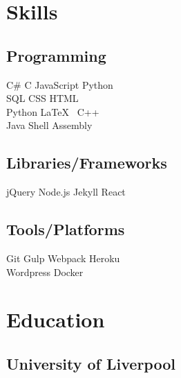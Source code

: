 \documentclass[]{CV}
\begin{document}
\begin{minipage}[t]{0.25\textwidth} 


\section{Skills}
\subsection{Programming}
\sectionsep
{}
C\# \textbullet{} C \textbullet{} JavaScript \textbullet{} Python    \\ SQL \textbullet{} CSS \textbullet{} HTML \textbullet{} \\
\sectionsep
{}
Python \textbullet{} \LaTeX\ \textbullet{}  C++  \\
\sectionsep
{}
Java \textbullet{}  Shell \textbullet{} Assembly \\
\sectionsep
\sectionsep
\subsection{Libraries/Frameworks}
\sectionsep
jQuery \textbullet{} Node.js \textbullet{} Jekyll \textbullet{} React \\
\sectionsep
\sectionsep
\subsection{Tools/Platforms}
\sectionsep
Git \textbullet{} Gulp \textbullet{} Webpack \textbullet{} Heroku    \\ Wordpress \textbullet{} Docker \\

\sectionsep


\section{Education} 
\subsection{University of Liverpool}


\end{minipage}
\end{document}
